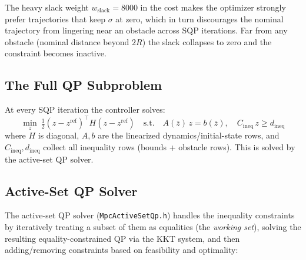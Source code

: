 ﻿\documentclass[11pt,a4paper]{article}
\begin{document}
The heavy slack weight $w_{\text{slack}}=8000$ in the cost makes the optimizer strongly prefer trajectories that keep $\sigma$ at zero, which in turn discourages the nominal trajectory from lingering near an obstacle across SQP iterations. Far from any obstacle (nominal distance beyond $2R$) the slack collapses to zero and the constraint becomes inactive.

\subsection{The Full QP Subproblem}
At every SQP iteration the controller solves:
\begin{equation}
\min_{z}\ \tfrac12 (z-z^{\text{ref}})^\top H (z-z^{\text{ref}}) \quad \text{s.t.}\quad A(\bar z)\, z = b(\bar z), \quad C_{\text{ineq}}\, z \geq d_{\text{ineq}}
\end{equation}
where $H$ is diagonal, $A,b$ are the linearized dynamics/initial-state rows, and $C_{\text{ineq}}, d_{\text{ineq}}$ collect all inequality rows (bounds + obstacle rows). This is solved by the active-set QP solver.

\subsection{Active-Set QP Solver}\label{sec:activeset}
The active-set QP solver (\texttt{MpcActiveSetQp.h}) handles the inequality constraints by iteratively treating a subset of them as equalities (the \emph{working set}), solving the resulting equality-constrained QP via the KKT system, and then adding/removing constraints based on feasibility and optimality:
\end{document}
